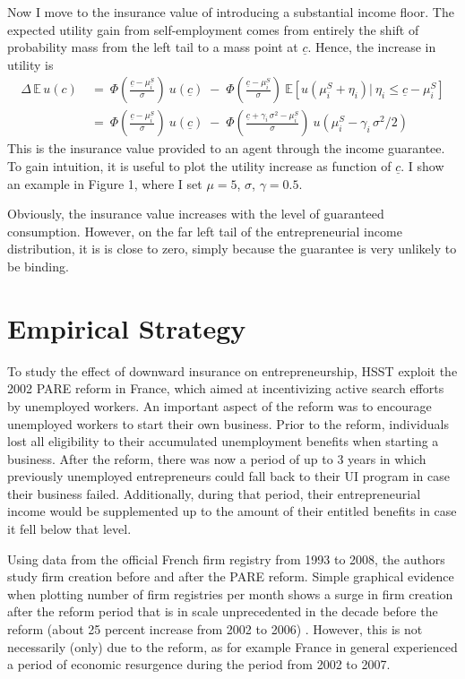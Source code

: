 \noindent Now I move to the insurance value of introducing a substantial income floor. The expected utility gain from self-employment comes from entirely the shift of probability mass from the left tail to a mass point at $\underline{c}$. Hence, the increase in utility is
\begin{align}
\Delta \,	\mathbb{E}\, u(c) \: & = \: \Phi\left(\frac{\underline{c} - \mu^S_i}{\sigma}\right) \: u(\underline{c}) \; - \; \Phi\left(\frac{\underline{c} - \mu_i^S}{\sigma}\right) \: \mathbb{E}\left[ u\left(\mu_i^S + \eta_i \right) | \:\eta_i \leq \underline{c} - \mu_i^S  \right]  \\[6pt]
& = \: \Phi\left(\frac{\underline{c} - \mu_i^S}{\sigma}\right) \: u(\underline{c}) \; - \; \Phi\left(\frac{\underline{c} + \gamma_i \, \sigma^2 - \mu_i^S}{\sigma}\right) \: u\left(\mu_i^S -  \gamma_i \,  \sigma^2 /2 \right)
\end{align}
This is the insurance value provided to an agent through the income guarantee. To gain intuition, it is useful to plot the utility increase as function of $\underline{c}$. I show an example in Figure 1, where I set $\mu = 5$, $\sigma$, $\gamma = 0.5$. 

Obviously, the insurance value increases with the level of guaranteed consumption. However, on the far left tail of the entrepreneurial income distribution, it is is close to zero, simply because the guarantee is very unlikely to be binding. 

\section{Empirical Strategy}

To study the effect of downward insurance on entrepreneurship, HSST exploit the 2002 PARE reform in France, which aimed at incentivizing active search efforts by unemployed workers. An important aspect of the reform was to encourage unemployed workers to start their own business. Prior to the reform, individuals lost all eligibility to their accumulated unemployment benefits when starting a business. After the reform, there was now a period of up to 3 years in which previously unemployed entrepreneurs could fall back to their UI program in case their business failed. Additionally, during that period, their entrepreneurial income would be supplemented up to the amount of their entitled benefits in case it fell below that level. \newline

\noindent Using data from the official French firm registry from 1993 to 2008, the authors study firm creation before and after the PARE reform. Simple graphical evidence when plotting number of firm registries per month shows a surge in firm creation after the reform period that is in scale unprecedented in the decade before the reform (about 25 percent increase from 2002 to 2006) . However, this is not necessarily (only) due to the reform, as for example France in general experienced a period of economic resurgence during the period from 2002 to 2007. 

